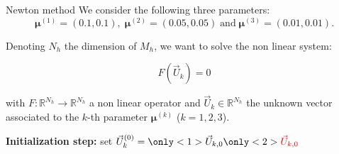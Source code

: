 \begin{frame}{Newton method}
	We consider the following three parameters:
	$$\bm{\mu}^{(1)} = (0.1,0.1), \; \bm{\mu}^{(2)} = (0.05,0.05) \; \text{and} \; \bm{\mu}^{(3)} = (0.01,0.01).$$

	Denoting $N_h$ the dimension of $M_h$, we want to solve the non linear system: %

    \normalsize
    \vspace{-10pt}
    \begin{equation*}
        F(\vec{U}_k) = 0 
    \end{equation*}

    with $F:\mathbb{R}^{N_h} \to \mathbb{R}^{N_h}$ a non linear operator and $\vec{U}_k\in \mathbb{R}^{N_h}$ the unknown vector associated to the $k$-th parameter $\bm{\mu}^{(k)}$ ($k=1,2,3$). \quad{}

	\setcounter{algocf}{0}
    \begin{center}
        \small
        \begin{minipage}{0.9\linewidth}
            \begin{algorithm}[H]
                \SetAlgoLined
                \caption{Newton algorithm} %
                \textbf{Initialization step:} set $\vec{U}_k^{(0)} = \only<1>{\vec{U}_{k,0}}\only<2>{\textcolor{darkred}{\vec{U}_{k,0}}}$\;
            \end{algorithm}
        \end{minipage}
    \end{center}
\end{frame}

